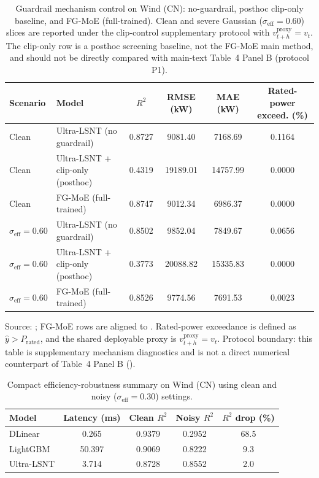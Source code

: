 ﻿\documentclass[review,1p,times]{elsarticle}
\begin{document}
\begin{table}[t]
\centering
\caption{Guardrail mechanism control on Wind (CN): no-guardrail, posthoc clip-only baseline, and FG-MoE (full-trained). Clean and severe Gaussian ($\sigma_{\mathrm{eff}}=0.60$) slices are reported under the clip-control supplementary protocol with $v_{t+h}^{\mathrm{proxy}}=v_t$. The clip-only row is a posthoc screening baseline, not the FG-MoE main method, and should not be directly compared with main-text Table~4 Panel B (protocol P1).}
\label{tab:clip_only_guardrail_control}
\begingroup
\setlength{\tabcolsep}{4pt}
\small
\begin{tabular}{llcccc}
\toprule
Scenario & Model & $R^2$ & RMSE (kW) & MAE (kW) & Rated-power exceed. (\%) \\
\midrule
Clean & Ultra-LSNT (no guardrail) & 0.8727 & 9081.40 & 7168.69 & 0.1164 \\
Clean & Ultra-LSNT + clip-only (posthoc) & 0.4319 & 19189.01 & 14757.99 & 0.0000 \\
Clean & FG-MoE (full-trained) & 0.8747 & 9012.34 & 6986.37 & 0.0000 \\
\midrule
$\sigma_{\mathrm{eff}}=0.60$ & Ultra-LSNT (no guardrail) & 0.8502 & 9852.04 & 7849.67 & 0.0656 \\
$\sigma_{\mathrm{eff}}=0.60$ & Ultra-LSNT + clip-only (posthoc) & 0.3773 & 20088.82 & 15335.83 & 0.0000 \\
$\sigma_{\mathrm{eff}}=0.60$ & FG-MoE (full-trained) & 0.8526 & 9774.56 & 7691.53 & 0.0023 \\
\bottomrule
\end{tabular}
\vspace{3pt}
\footnotesize Source: ; FG-MoE rows are aligned to . Rated-power exceedance is defined as $\hat y>P_{\mathrm{rated}}$, and the shared deployable proxy is $v_{t+h}^{\mathrm{proxy}}=v_t$. Protocol boundary: this table is supplementary mechanism diagnostics and is not a direct numerical counterpart of Table~4 Panel B ().
\endgroup
\end{table}

\begin{table}[t]
\centering
\caption{Compact efficiency-robustness summary on Wind (CN) using clean and noisy ($\sigma_{\mathrm{eff}}=0.30$) settings.}
\label{tab:eff_robust_tradeoff}
\scriptsize
\begin{tabular}{lcccc}
\toprule
Model & Latency (ms) & Clean $R^2$ & Noisy $R^2$ & $R^2$ drop (\%) \\
\midrule
DLinear & 0.265 & 0.9379 & 0.2952 & 68.5 \\
LightGBM & 50.397 & 0.9069 & 0.8222 & 9.3 \\
Ultra-LSNT & 3.714 & 0.8728 & 0.8552 & 2.0 \\
\bottomrule
\end{tabular}
\end{table}
\end{document}
